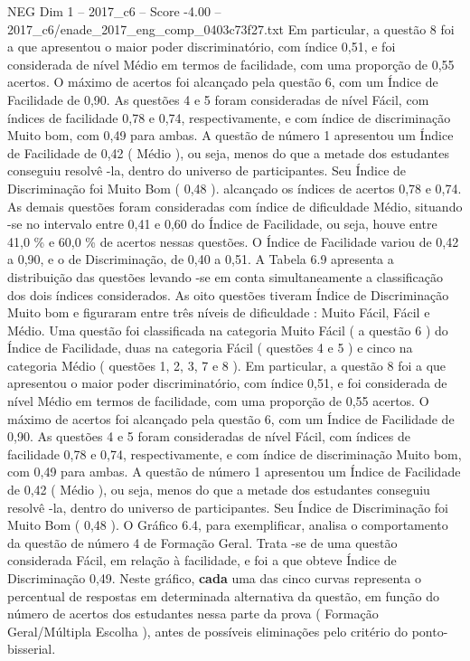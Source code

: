\begin{textsample}{NEG Dim 1 – 2017\_c6 – Score -4.00 – 2017\_c6/enade\_2017\_eng\_comp\_0403c73f27.txt}
Em particular, a questão 8 foi a que apresentou o maior poder discriminatório, com índice 0,51, e foi considerada de nível Médio em termos de facilidade, com uma proporção de 0,55 acertos.
O máximo de acertos foi alcançado pela questão 6, com um Índice de Facilidade de 0,90.
As questões 4 e 5 foram consideradas de nível Fácil, com índices de facilidade 0,78 e 0,74, respectivamente, e com índice de discriminação Muito bom, com 0,49 para ambas.
A questão de número 1 apresentou um Índice de Facilidade de 0,42 ( Médio ), ou seja, menos do que a metade dos estudantes conseguiu resolvê -la, dentro do universo de participantes.
Seu Índice de Discriminação foi Muito Bom ( 0,48 ). alcançado os índices de acertos 0,78 e 0,74.
As demais questões foram consideradas com índice de dificuldade Médio, situando -se no intervalo entre 0,41 e 0,60 do Índice de Facilidade, ou seja, houve entre 41,0 \% e 60,0 \% de acertos nessas questões.
O Índice de Facilidade variou de 0,42 a 0,90, e o de Discriminação, de 0,40 a 0,51.
A Tabela 6.9 apresenta a distribuição das questões levando -se em conta simultaneamente a classificação dos dois índices considerados.
As oito questões tiveram Índice de Discriminação Muito bom e figuraram entre três níveis de dificuldade : Muito Fácil, Fácil e Médio.
Uma questão foi classificada na categoria Muito Fácil ( a questão 6 ) do Índice de Facilidade, duas na categoria Fácil ( questões 4 e 5 ) e cinco na categoria Médio ( questões 1, 2, 3, 7 e 8 ).
Em particular, a questão 8 foi a que apresentou o maior poder discriminatório, com índice 0,51, e foi considerada de nível Médio em termos de facilidade, com uma proporção de 0,55 acertos.
O máximo de acertos foi alcançado pela questão 6, com um Índice de Facilidade de 0,90.
As questões 4 e 5 foram consideradas de nível Fácil, com índices de facilidade 0,78 e 0,74, respectivamente, e com índice de discriminação Muito bom, com 0,49 para ambas.
A questão de número 1 apresentou um Índice de Facilidade de 0,42 ( Médio ), ou seja, menos do que a metade dos estudantes conseguiu resolvê -la, dentro do universo de participantes.
Seu Índice de Discriminação foi Muito Bom ( 0,48 ).
O Gráfico 6.4, para exemplificar, analisa o comportamento da questão de número 4 de Formação Geral.
Trata -se de uma questão considerada Fácil, em relação à facilidade, e foi a que obteve Índice de Discriminação 0,49.
Neste gráfico, \textbf{cada} uma das cinco curvas representa o percentual de respostas em determinada alternativa da questão, em função do número de acertos dos estudantes nessa parte da prova ( Formação Geral/Múltipla Escolha ), antes de possíveis eliminações pelo critério do ponto-bisserial.

\end{textsample}
